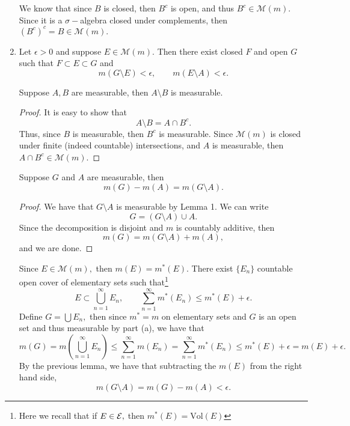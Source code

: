 \documentclass[11pt]{article}
\newcommand{\Vol}{\text{Vol}}
\newcommand{\sm}{\setminus}
\begin{document}
\begin{problem}
\begin{enumerate}
\begin{solution}
            We know that since $B$ is closed, then $B^c$ is open, and thus $B^c \in \mathcal{M}(m).$ Since it is a $\sigma-$algebra closed under complements, then $(B^c)^c = B \in \mathcal{M}(m).$
        \end{solution}
        \item Let $\epsilon>0$ and suppose $E \in \mathcal{M}(m).$ Then there exist closed $F$ and open $G$ such that $F \subset E \subset G$ and
        \[m(G\setminus E) < \epsilon, \qquad m(E \sm A)< \epsilon.\]
    \begin{solution}
        \begin{lemma}
            Suppose $A, B$ are measurable, then $A \setminus B$ is measurable. 
        \end{lemma}
        \begin{proof}
            It is easy to show that 
            \[A \setminus B = A \cap B^c.\] Thus, since $B$ is measurable, then $B^c$ is measurable. Since $\mathcal{M}(m)$ is closed under finite (indeed countable) intersections, and $A$ is measurable, then $A \cap B^c \in \mathcal{M}(m).$ 
        \end{proof}
    \begin{lemma}
        Suppose $G$ and $A$ are measurable, then 
        \[m(G) - m(A) = m(G\setminus A).\]
    \end{lemma}
    \begin{proof}
        We have that $G\setminus A$ is measurable by Lemma 1. We can write
        \[G = (G\setminus A) \cup A.\] Since the decomposition is disjoint and $m$ is countably additive, then 
        \[m(G) = m(G\setminus A) + m(A),\] and we are done.
    \end{proof}
        Since $E \in \mathcal{M}(m),$ then $m(E) = m^*(E).$ There exist $\{E_n\}$ countable open cover of elementary sets such that\footnote{Here we recall that if $E\in \cal E,$ then $m^*(E) = \Vol(E)$} 
        \[E \subset \bigcup_{n=1}^\infty E_n, \qquad \sum_{n=1}^\infty m^*(E_n) \leq m^*(E) + \epsilon.\] Define $G = \bigcup E_n,$ then since $m^* = m$ on elementary sets and $G$ is an open set and thus measurable by part (a), we have that
        \[m(G) = m(\bigcup_{n=1}^\infty E_n) \leq \sum_{n=1}^\infty m(E_n) = \sum_{n=1}^\infty m^*(E_n) \leq m^*(E) + \epsilon = m(E) + \epsilon.\] By the previous lemma, we have that subtracting the $m(E)$ from the right hand side,
        \[m(G \setminus A) = m(G) - m(A) < \epsilon.\]


\end{solution}
\end{enumerate}
\end{problem}
\end{document}
